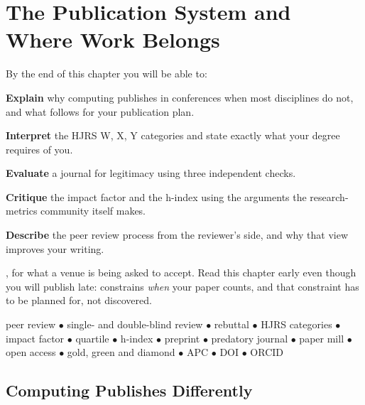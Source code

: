 \chapter{The Publication System and Where Work Belongs}\label{ch:publication}

\begin{outcomes}
By the end of this chapter you will be able to:
\begin{tight}
  \item \textbf{Explain} why computing publishes in conferences when most
    disciplines do not, and what follows for your publication plan.
  \item \textbf{Interpret} the HJRS W, X, Y categories and state exactly what
    your degree requires of you.
  \item \textbf{Evaluate} a journal for legitimacy using three independent
    checks.
  \item \textbf{Critique} the impact factor and the h-index using the arguments
    the research-metrics community itself makes.
  \item \textbf{Describe} the peer review process from the reviewer's side, and
    why that view improves your writing.
\end{tight}
\end{outcomes}

\begin{prereq}
, for what a venue is being asked to accept. Read this
chapter early even though you will publish late: 
constrains \emph{when} your paper counts, and that constraint has to be planned
for, not discovered.
\end{prereq}

\begin{keyterms}
peer review $\bullet$ single- and double-blind review $\bullet$ rebuttal
$\bullet$ HJRS categories $\bullet$ impact factor $\bullet$ quartile $\bullet$
h-index $\bullet$ preprint $\bullet$ predatory journal $\bullet$ paper mill
$\bullet$ open access $\bullet$ gold, green and diamond $\bullet$ APC
$\bullet$ DOI $\bullet$ ORCID
\end{keyterms}

\section{Computing Publishes Differently}

